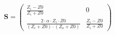 \begin{equation} \mathbf{S} = \left(\begin{array}{cc} \frac{Z_i - Z0}{Z_i + Z0} & 0 \\ \frac{2\cdot \alpha \cdot Z_i \cdot Z0}{\left( Z_i +Z0\right)\cdot\left( Z_o + Z0\right)} & \frac{Z_i - Z0}{Z_i + Z0} \end{array}\right) \end{equation}

